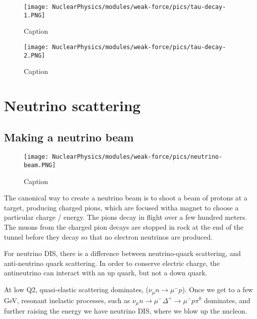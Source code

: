             \begin{figure}[H]
                \centering
                \texttt{[image: NuclearPhysics/modules/weak-force/pics/tau-decay-1.PNG]}
            \caption{Caption}
            \end{figure}
            
            
            \begin{figure}[H]
                \centering
                \texttt{[image: NuclearPhysics/modules/weak-force/pics/tau-decay-2.PNG]}
            \caption{Caption}
            \end{figure}
            
    
    \section{Neutrino scattering}
        \subsection{Making a neutrino beam}
        
            \begin{figure}[H]
                \centering
                \texttt{[image: NuclearPhysics/modules/weak-force/pics/neutrino-beam.PNG]}
            \caption{Caption}
            \end{figure}
            
        
        The canonical way to create a neutrino beam is to shoot a beam of protons at a target, producing charged pions, which are focused witha magnet to choose a particular charge / energy. The pions decay in flight over a few hundred meters. The muons from the charged pion decays are stopped in rock at the end of the tunnel before they decay so that no electron neutrinos are produced. 
        
        For neutrino DIS, there is a difference between neutrino-quark scattering, and anti-neutrino quark scattering. In order to conserve electric charge, the antineutrino can interact with an up quark, but not a down quark. 
        
        At low Q2, quasi-elastic scattering dominates, ($\nu_{\mu}n \longrightarrow \mu^- p$). Once we get to a few GeV, resonant inelastic processes, such as $\nu_{\mu}n \longrightarrow \mu^- \Delta^+ \longrightarrow \mu^- p \pi^0$ dominates, and further raising the energy we have neutrino DIS, where we blow up the nucleon.
        
